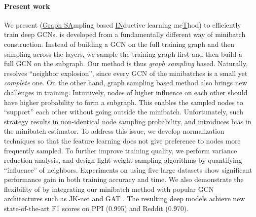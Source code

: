 \paragraph{Present work} We present {\graphsaint} (\underline{Graph SA}mpling based \underline{IN}ductive learning me\underline{T}hod) to efficiently train deep GCNs. %
{\graphsaint} is developed from a fundamentally different way of minibatch construction. Instead of building a GCN on the full training graph and then sampling across the layers, we sample the training graph first and then build a full GCN on the subgraph. Our method is thus \textit{graph sampling} based. 
Naturally, {\graphsaint} resolves ``neighbor explosion'', since every GCN of the minibatches is a small yet \textit{complete} one. 
On the other hand, graph sampling based method also brings new challenges in training. 
Intuitively, nodes of higher influence on each other should have higher probability to form a subgraph. This enables the sampled nodes to ``support'' each other without going outside the minibatch. 
Unfortunately, such strategy results in non-identical node sampling probability, and introduces bias in the minibatch estimator. 
To address this issue, we develop normalization techniques so that the feature learning does not give preference to nodes more frequently sampled. %
To further improve training quality, we perform variance reduction analysis, and design light-weight sampling algorithms by quantifying ``influence'' of neighbors. 
Experiments on {\graphsaint} using five large datasets show significant performance gain in both training accuracy and time. 
We also demonstrate the flexibility of {\graphsaint} by integrating our minibatch method with popular GCN architectures such as JK-net \citep{jk-net} and GAT \citep{gat}. 
The resulting deep models achieve new state-of-the-art F1 scores on PPI (0.995) and Reddit (0.970). 

